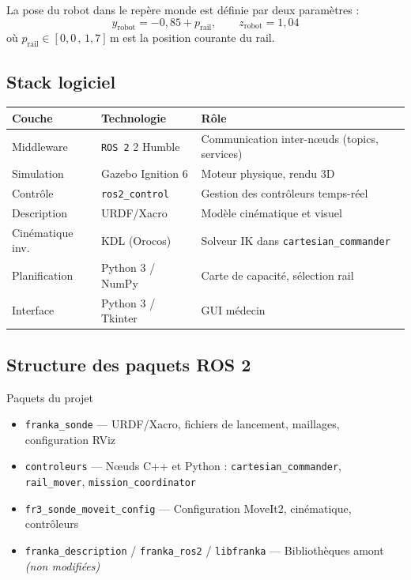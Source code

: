 \documentclass[11pt, a4paper]{article}
\newcommand{\ros}{\texttt{ROS\,2}}
\newcommand{\pkg}[1]{\texttt{\color{PrimaryBlue}#1}}
\begin{document}
\vspace{6pt}

La pose du robot dans le repère monde est définie par deux paramètres :
\begin{equation}
  y_{\text{robot}} = -0{,}85 + p_{\text{rail}}, \qquad z_{\text{robot}} = 1{,}04
  \label{eq:robot_pose}
\end{equation}
où $p_{\text{rail}} \in [0{,}0\,,\,1{,}7]$\,m est la position courante du rail.

\subsection{Stack logiciel}

\begin{center}
\begin{tabular}{lll}
  \toprule
  \rowcolor{LightBlue}
  \textbf{Couche} & \textbf{Technologie} & \textbf{Rôle} \\
  \midrule
  Middleware       & \ros{} 2 Humble       & Communication inter-nœuds (topics, services) \\
  Simulation       & Gazebo Ignition 6     & Moteur physique, rendu 3D \\
  Contrôle         & \pkg{ros2\_control}   & Gestion des contrôleurs temps-réel \\
  Description      & URDF/Xacro            & Modèle cinématique et visuel \\
  Cinématique inv. & KDL (Orocos)          & Solveur IK dans \pkg{cartesian\_commander} \\
  Planification    & Python 3 / NumPy      & Carte de capacité, sélection rail \\
  Interface        & Python 3 / Tkinter    & GUI médecin \\
  \bottomrule
\end{tabular}
\end{center}

\subsection{Structure des paquets ROS 2}

\begin{techbox}{Paquets du projet}
\begin{itemize}[leftmargin=1em, itemsep=2pt]
  \item \pkg{franka\_sonde} — URDF/Xacro, fichiers de lancement, maillages, configuration RViz
  \item \pkg{controleurs} — Nœuds C++ et Python : \texttt{cartesian\_commander}, \texttt{rail\_mover}, \texttt{mission\_coordinator}
  \item \pkg{fr3\_sonde\_moveit\_config} — Configuration MoveIt2, cinématique, contrôleurs
  \item \pkg{franka\_description} / \pkg{franka\_ros2} / \pkg{libfranka} — Bibliothèques amont \textit{(non modifiées)}
\end{itemize}
\end{techbox}
\end{document}
